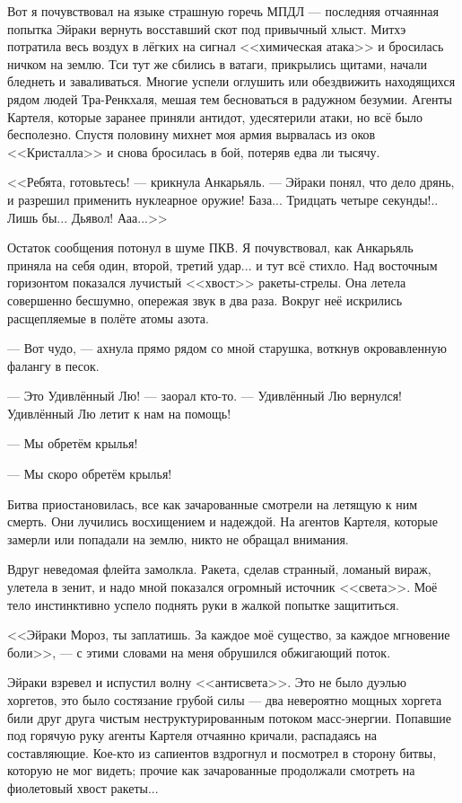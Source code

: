 Вот я почувствовал на языке страшную горечь МПДЛ --- последняя отчаянная попытка Эйраки вернуть восставший скот под привычный хлыст.
Митхэ потратила весь воздух в лёгких на сигнал <<химическая атака>> и бросилась ничком на землю.
Тси тут же сбились в ватаги, прикрылись щитами, начали бледнеть и заваливаться.
Многие успели оглушить или обездвижить находящихся рядом людей Тра-Ренкхаля, мешая тем бесноваться в радужном безумии.
Агенты Картеля, которые заранее приняли антидот, удесятерили атаки, но всё было бесполезно.
Спустя половину михнет моя армия вырвалась из оков <<Кристалла>> и снова бросилась в бой, потеряв едва ли тысячу.

<<Ребята, готовьтесь! --- крикнула Анкарьяль.
--- Эйраки понял, что дело дрянь, и разрешил применить нуклеарное оружие!
База... Тридцать четыре секунды!.. Лишь бы... Дьявол! Ааа...>>

Остаток сообщения потонул в шуме ПКВ.
Я почувствовал, как Анкарьяль приняла на себя один, второй, третий удар... и тут всё стихло.
Над восточным горизонтом показался лучистый <<хвост>> ракеты-стрелы.
Она летела совершенно бесшумно, опережая звук в два раза.
Вокруг неё искрились расщепляемые в полёте атомы азота.

--- Вот чудо, --- ахнула прямо рядом со мной старушка, воткнув окровавленную фалангу в песок.

--- Это Удивлённый Лю! --- заорал кто-то.
--- Удивлённый Лю вернулся!
Удивлённый Лю летит к нам на помощь!

--- Мы обретём крылья!

--- Мы скоро обретём крылья!

Битва приостановилась, все как зачарованные смотрели на летящую к ним смерть.
Они лучились восхищением и надеждой.
На агентов Картеля, которые замерли или попадали на землю, никто не обращал внимания.

Вдруг неведомая флейта замолкла.
Ракета, сделав странный, ломаный вираж, улетела в зенит, и надо мной показался огромный источник <<света>>.
Моё тело инстинктивно успело поднять руки в жалкой попытке защититься.

<<Эйраки Мороз, ты заплатишь.
За каждое моё существо, за каждое мгновение боли>>, --- с этими словами на меня обрушился обжигающий поток.

Эйраки взревел и испустил волну <<антисвета>>.
Это не было дуэлью хоргетов, это было состязание грубой силы --- два невероятно мощных хоргета били друг друга чистым неструктурированным потоком масс-энергии.
Попавшие под горячую руку агенты Картеля отчаянно кричали, распадаясь на составляющие.
Кое-кто из сапиентов вздрогнул и посмотрел в сторону битвы, которую не мог видеть;
прочие как зачарованные продолжали смотреть на фиолетовый хвост ракеты...

